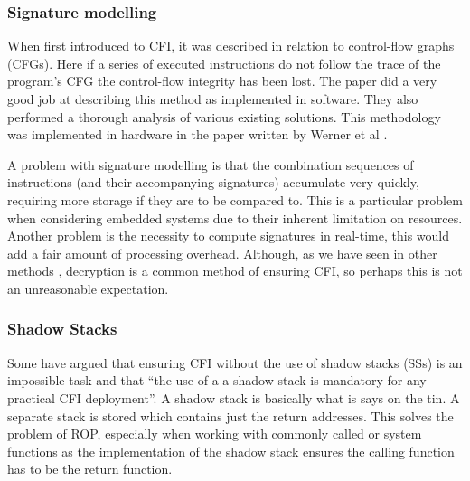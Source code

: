 \subsubsection{Signature modelling}
When first introduced to CFI, it was described in relation to control-flow graphs (CFGs). Here if a series of executed instructions do not follow the trace of the program’s CFG the control-flow integrity has been lost. The paper \cite{Yang2013} did a very good job at describing this method as implemented in software. They also performed a thorough analysis of various existing solutions. This methodology was implemented in hardware in the paper written by Werner et al \cite{Werner2016}.

A problem with signature modelling is that the combination sequences of instructions (and their accompanying signatures) accumulate very quickly, requiring more storage if they are to be compared to. This is a particular problem when considering embedded systems due to their inherent limitation on resources. Another problem is the necessity to compute signatures in real-time, this would add a fair amount of processing overhead. Although, as we have seen in other methods \cite{Davi2015} \cite{Lee2019}, decryption is a common method of ensuring CFI, so perhaps this is not an unreasonable expectation.

\subsubsection{Shadow Stacks}
Some \cite{Christoulakis2016} have argued that ensuring CFI without the use of shadow stacks (SSs) is an impossible task and that “the use of a a shadow stack is mandatory for any practical CFI deployment”. A shadow stack is basically what is says on the tin. A separate stack is stored which contains just the return addresses. This solves the problem of ROP, especially when working with commonly called or system functions as the implementation of the shadow stack ensures the calling function has to be the return function.

